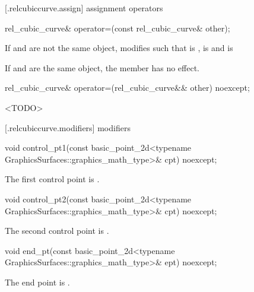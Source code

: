  [\iotwod.relcubiccurve.assign] { assignment operators}

%
\begin{itemdecl}
rel_cubic_curve& operator=(const rel_cubic_curve& other);
\end{itemdecl}
\begin{itemdescr}
\pnum
\effects
If  and  are not the same object, modifies  such that  is ,  is  and  is 

\pnum
If  and  are the same object, the member has no effect.

\pnum
\returns
{}
\end{itemdescr}

%
\begin{itemdecl}
rel_cubic_curve& operator=(rel_cubic_curve&& other) noexcept;
\end{itemdecl}
\begin{itemdescr}
\pnum
\effects
<TODO>

\pnum
\returns
{}
\end{itemdescr}

 [\iotwod.relcubiccurve.modifiers]{ modifiers}

%
\begin{itemdecl}
void control_pt1(const basic_point_2d<typename
  GraphicsSurfaces::graphics_math_type>& cpt) noexcept;
\end{itemdecl}
\begin{itemdescr}
\pnum
\effects
The first control point is .
\end{itemdescr}

%
\begin{itemdecl}
void control_pt2(const basic_point_2d<typename
  GraphicsSurfaces::graphics_math_type>& cpt) noexcept;
\end{itemdecl}
\begin{itemdescr}
\pnum
\effects
The second control point is .
\end{itemdescr}

%
\begin{itemdecl}
void end_pt(const basic_point_2d<typename GraphicsSurfaces::graphics_math_type>& ept) noexcept;
\end{itemdecl}
\begin{itemdescr}
\pnum
\effects
The end point is .
\end{itemdescr}

